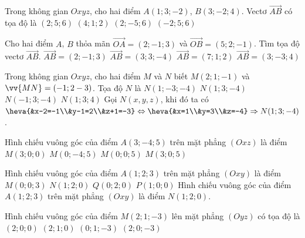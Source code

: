 \begin{ex}
	Trong không gian $ Oxyz $, cho hai điểm $ A(1;3;-2) $, $ B(3;-2;4) $. Vectơ $ \overrightarrow{AB} $ có tọa độ là
	\choice
	{\True $ (2;5;6) $}
	{$ (4;1;2) $}
	{\True $ (2;-5;6) $}
	{$ (-2;5;6) $}
\end{ex} 

\begin{ex}
	Cho hai điểm $A$, $B$ thỏa mãn $\vec{OA} = (2;-1; 3)$ và  $\vec{OB}= (5;2;-1)$. Tìm tọa độ vectơ $\vec{AB}$.
	\choice
	{$\vec{AB} =(2;-1;3)$}
	{\True  $\vec{AB} =(3;3;-4)$}
	{$\vec{AB} = (7;1;2)$}
	{$\vec{AB} =(3;-3;4)$}
\end{ex} 

\begin{ex}
	Trong không gian $Oxyz$, cho hai điểm $M$ và $N$ biết $M(2;1;-1)$ và $\vv{MN}=(-1;2-3)$. Tọa độ $N$ là
	\choice
	{$N(1;-3;-4)$}
	{\True $N(1;3;-4)$}
	{$N(-1;3;-4)$}
	{$N(1;3;4)$}
	\loigiai
	{
		Gọi $N(x,y,z)$, khi đó ta có $\heva{&x-2=-1\\&y-1=2\\&z+1=-3}\Leftrightarrow \heva{&x=1\\&y=3\\&z=-4}\Rightarrow N(1;3;-4)$.\\
	}
\end{ex} 

\begin{ex}
	Hình chiếu vuông góc của điểm $A(3;-4;5)$ trên mặt phẳng $(Oxz)$ là điểm
	\choice
	{$M(3;0;0)$}
	{$M(0;-4;5)$}
	{$M(0;0;5)$}
	{\True $M(3;0;5)$}
\end{ex} 

\begin{ex}
	Hình chiếu vuông góc của điểm $A(1;2;3)$ trên mặt phẳng $(Oxy)$ là điểm
	\choice
	{$M(0;0;3)$}
	{\True $N(1;2;0)$}
	{$Q(0;2;0)$}
	{$P(1;0;0)$}
	\loigiai
	{
		Hình chiếu vuông góc của điểm $A(1;2;3)$ trên mặt phẳng $(Oxy)$ là điểm $N(1;2;0)$.
	}
\end{ex} 

\begin{ex}
	Hình chiếu vuông góc của điểm $M(2;1;-3)$ lên mặt phẳng $(Oyz)$ có tọa độ là
	\choice
	{$(2;0;0)$}
	{$(2;1;0)$}
	{\True $(0;1;-3)$}
	{$(2;0;-3)$}
\end{ex} 

